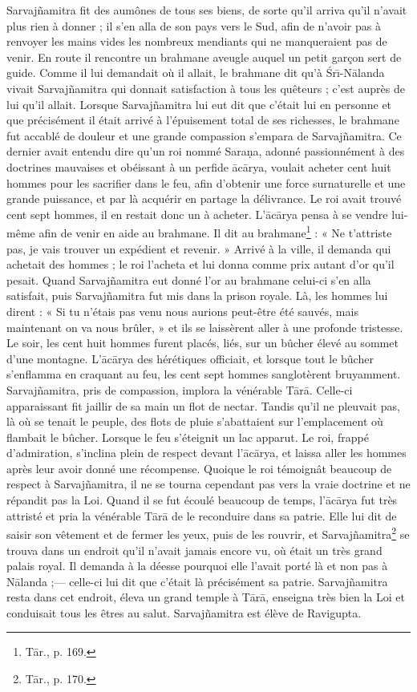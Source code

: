 \documentclass[a4paper, 11pt, oneside, french]{article}
\begin{document}
Sarvaj\~{n}amitra fit des aumônes de tous ses biens, de sorte qu'il arriva qu'il n'avait plus rien à donner ; il s'en alla de son pays vers le Sud, afin de n'avoir pas à renvoyer les mains vides les nombreux mendiants qui ne manqueraient pas de venir. En route il rencontre un brahmane aveugle auquel un petit garçon sert de guide. Comme il lui demandait où il allait, le brahmane dit qu'à \'{S}r\={\i}-N\={a}landa vivait Sarvaj\~{n}amitra qui donnait satisfaction à tous les quêteurs ; c'est auprès de lui qu'il allait. Lorsque Sarvaj\~{n}amitra lui eut dit que c'était lui en personne et que précisément il était arrivé à l'épuisement total de ses richesses, le brahmane fut accablé de douleur et une grande compassion s'empara de Sarvaj\~{n}amitra. Ce dernier avait entendu dire qu'un roi nommé Sara\d{n}a, adonné passionnément à des doctrines mauvaises et obéissant à un perfide \={a}c\={a}rya, voulait acheter cent huit hommes pour les sacrifier dans le feu, afin d'obtenir une force surnaturelle et une grande puissance, et par là acquérir en partage la délivrance. Le roi avait trouvé cent sept hommes, il en restait donc un à acheter. L'\={a}c\={a}rya pensa à se vendre lui-même afin de venir en aide au brahmane. Il dit au brahmane\footnote{T\={a}r., p. 169.} : « Ne t'attriste pas, je vais trouver un expédient et revenir. » Arrivé à la ville, il demanda qui achetait des hommes ; le roi l'acheta et lui donna comme prix autant d'or qu'il pesait. Quand Sarvaj\~{n}amitra eut donné l'or au brahmane celui-ci s'en alla satisfait, puis Sarvaj\~{n}amitra fut mis dans la prison royale. Là, les hommes lui dirent : « Si tu n'étais pas venu nous aurions peut-être été sauvés, mais maintenant on va nous brûler, » et ils se laissèrent aller à une profonde tristesse. Le soir, les cent huit hommes furent placés, liés, sur un bûcher élevé au sommet d'une montagne. L'\={a}c\={a}rya des hérétiques officiait, et lorsque tout le bûcher s'enflamma en craquant au feu, les cent sept hommes sanglotèrent bruyamment. Sarvaj\~{n}amitra, pris de compassion, implora la vénérable T\={a}r\={a}. Celle-ci apparaissant fit jaillir de sa main un flot de nectar. Tandis qu'il ne pleuvait pas, là où se tenait le peuple, des flots de pluie s'abattaient sur l'emplacement où flambait le bûcher. Lorsque le feu s'éteignit un lac apparut. Le roi, frappé d'admiration, s'inclina plein de respect devant l'\={a}c\={a}rya, et laissa aller les hommes après leur avoir donné une récompense. Quoique le roi témoignât beaucoup de respect à Sarvaj\~{n}amitra, il ne se tourna cependant pas vers la vraie doctrine et ne répandit pas la Loi. Quand il se fut écoulé beaucoup de temps, l'\={a}c\={a}rya fut très attristé et pria la vénérable T\={a}r\={a} de le reconduire dans sa patrie. Elle lui dit de saisir son vêtement et de fermer les yeux, puis de les rouvrir, et Sarvaj\~{n}amitra\footnote{T\={a}r., p. 170.} se trouva dans un endroit qu'il n'avait jamais encore vu, où était un très grand palais royal. Il demanda à la déesse pourquoi elle l'avait porté là et non pas à N\={a}landa ;--- celle-ci lui dit que c'était là précisément sa patrie. Sarvaj\~{n}amitra resta dans cet endroit, éleva un grand temple à T\={a}r\={a}, enseigna très bien la Loi et conduisait tous les êtres au salut. Sarvaj\~{n}amitra est élève de Ravigupta.
\end{document}

